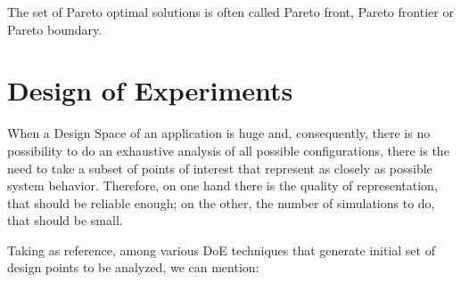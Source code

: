 The set of Pareto optimal solutions is often called Pareto front, Pareto frontier or Pareto boundary.





\section{Design of Experiments}\label{doe}

When a Design Space of an application is huge and, consequently, there is no possibility to do an exhaustive analysis of all possible configurations, there is the need to take a subset of points of interest that represent as closely as possible system behavior. Therefore, on one hand there is the quality of representation, that should be reliable enough; on the other, the number of simulations to do, that should be small.

Taking \cite{natrella2013nist} as reference, among various DoE techniques that generate initial set of design points to be analyzed, we can mention:

